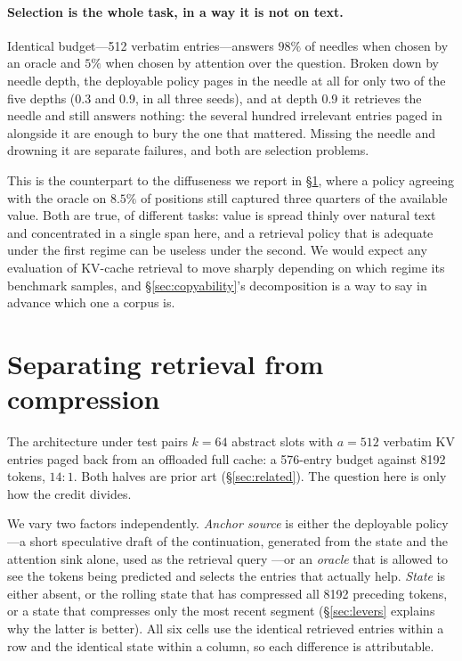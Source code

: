 \documentclass[11pt]{article}
\begin{document}
\paragraph{Selection is the whole task, in a way it is not on text.}
Identical budget---512 verbatim entries---answers $98\%$ of needles when chosen
by an oracle and $5\%$ when chosen by attention over the question. Broken down
by needle depth, the deployable policy pages in the needle at all for only two
of the five depths (0.3 and 0.9, in all three seeds), and at depth 0.9 it
retrieves the needle and still answers nothing: the several hundred irrelevant
entries paged in alongside it are enough to bury the one that mattered. Missing
the needle and drowning it are separate failures, and both are selection
problems.

This is the counterpart to the diffuseness we report in
\S\ref{sec:decomposition}, where a policy agreeing with the oracle on $8.5\%$ of
positions still captured three quarters of the available value. Both are true,
of different tasks: value is spread thinly over natural text and concentrated in
a single span here, and a retrieval policy that is adequate under the first
regime can be useless under the second. We would expect any evaluation of
KV-cache retrieval to move sharply depending on which regime its benchmark
samples, and \S\ref{sec:copyability}'s decomposition is a way to say in advance
which one a corpus is.

\section{Separating retrieval from compression}
\label{sec:decomposition}

The architecture under test pairs $k=64$ abstract slots with $a=512$ verbatim KV
entries paged back from an offloaded full cache: a 576-entry budget against 8192
tokens, $14{:}1$. Both halves are prior art (\S\ref{sec:related}). The question
here is only how the credit divides.

We vary two factors independently. \emph{Anchor source} is either the deployable
policy---a short speculative draft of the continuation, generated from the state
and the attention sink alone, used as the retrieval query \citep{specache}---or an
\emph{oracle} that is allowed to see the tokens being predicted and selects the
entries that actually help. \emph{State} is either absent, or the rolling state
that has compressed all 8192 preceding tokens, or a state that compresses only
the most recent segment (\S\ref{sec:levers} explains why the latter is better).
All six cells use the identical retrieved entries within a row and the identical
state within a column, so each difference is attributable.
\end{document}
